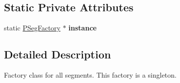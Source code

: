 \subsection*{Static Private Attributes}
\begin{DoxyCompactItemize}
\item 
\hypertarget{classprocedural_1_1_p_seg_factory_a97975b083b84bc01fa7e7616724890e3}{static \hyperlink{classprocedural_1_1_p_seg_factory}{P\-Seg\-Factory} $\ast$ {\bfseries instance}}\label{classprocedural_1_1_p_seg_factory_a97975b083b84bc01fa7e7616724890e3}

\end{DoxyCompactItemize}


\subsection{Detailed Description}
Factory class for all segments. This factory is a singleton. 

